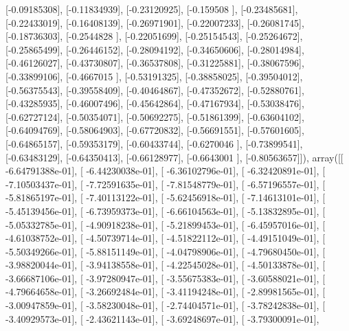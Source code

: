 \documentclass{article}
\begin{document}
       [-0.09185308],
       [-0.11834939],
       [-0.23120925],
       [-0.159508  ],
       [-0.23485681],
       [-0.22433019],
       [-0.16408139],
       [-0.26971901],
       [-0.22007233],
       [-0.26081745],
       [-0.18736303],
       [-0.2544828 ],
       [-0.22051699],
       [-0.25154543],
       [-0.25264672],
       [-0.25865499],
       [-0.26446152],
       [-0.28094192],
       [-0.34650606],
       [-0.28014984],
       [-0.46126027],
       [-0.43730807],
       [-0.36537808],
       [-0.31225881],
       [-0.38067596],
       [-0.33899106],
       [-0.4667015 ],
       [-0.53191325],
       [-0.38858025],
       [-0.39504012],
       [-0.56375543],
       [-0.39558409],
       [-0.40464867],
       [-0.47352672],
       [-0.52880761],
       [-0.43285935],
       [-0.46007496],
       [-0.45642864],
       [-0.47167934],
       [-0.53038476],
       [-0.62727124],
       [-0.50354071],
       [-0.50692275],
       [-0.51861399],
       [-0.63604102],
       [-0.64094769],
       [-0.58064903],
       [-0.67720832],
       [-0.56691551],
       [-0.57601605],
       [-0.64865157],
       [-0.59353179],
       [-0.60433744],
       [-0.6270046 ],
       [-0.73899541],
       [-0.63483129],
       [-0.64350413],
       [-0.66128977],
       [-0.6643001 ],
       [-0.80563657]]), array([[ -6.64791388e-01],
       [ -6.44230038e-01],
       [ -6.36102796e-01],
       [ -6.32420891e-01],
       [ -7.10503437e-01],
       [ -7.72591635e-01],
       [ -7.81548779e-01],
       [ -6.57196557e-01],
       [ -5.81865197e-01],
       [ -7.40113122e-01],
       [ -5.62456918e-01],
       [ -7.14613101e-01],
       [ -5.45139456e-01],
       [ -6.73959373e-01],
       [ -6.66104563e-01],
       [ -5.13832895e-01],
       [ -5.05332785e-01],
       [ -4.90918238e-01],
       [ -5.21899453e-01],
       [ -6.45957016e-01],
       [ -4.61038752e-01],
       [ -4.50739714e-01],
       [ -4.51822112e-01],
       [ -4.49151049e-01],
       [ -5.50349266e-01],
       [ -5.88151149e-01],
       [ -4.04798906e-01],
       [ -4.79680450e-01],
       [ -3.98820044e-01],
       [ -3.94138558e-01],
       [ -4.22545028e-01],
       [ -4.50133878e-01],
       [ -3.66687106e-01],
       [ -3.97280947e-01],
       [ -3.55675383e-01],
       [ -3.60588021e-01],
       [ -4.79664658e-01],
       [ -3.26692484e-01],
       [ -3.41194248e-01],
       [ -2.89981565e-01],
       [ -3.00947859e-01],
       [ -3.58230048e-01],
       [ -2.74404571e-01],
       [ -3.78242838e-01],
       [ -3.40929573e-01],
       [ -2.43621143e-01],
       [ -3.69248697e-01],
       [ -3.79300091e-01],
\end{document}
